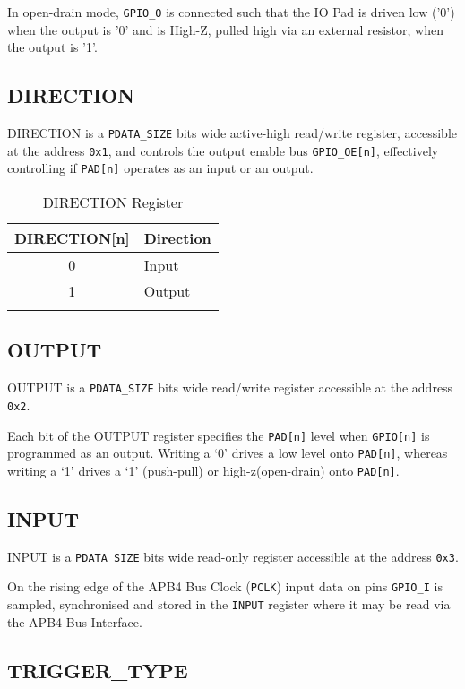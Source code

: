 In open-drain mode, \texttt{GPIO\_O} is connected such that the IO Pad is driven low ('0') when the output is '0' and is High-Z, pulled high via an external resistor, when the output is '1'.

\subsection{DIRECTION}\label{direction}

DIRECTION is a \texttt{PDATA\_SIZE} bits wide active-high read/write register, accessible at the address \texttt{0x1}, and controls the output enable bus \texttt{GPIO\_OE[n]}, effectively controlling if \texttt{PAD[n]} operates as an input or an output.

\begin{longtable}[]{@{}cl@{}}
\toprule
\textbf{DIRECTION[n]} & \textbf{Direction}\tabularnewline
\midrule
\endhead
0 & Input\tabularnewline
1 & Output\tabularnewline
\bottomrule
\caption{DIRECTION Register}
\end{longtable}

\subsection{OUTPUT}\label{output}

OUTPUT is a \texttt{PDATA\_SIZE} bits wide read/write register accessible at the address \texttt{0x2}.

Each bit of the OUTPUT register specifies the \texttt{PAD[n]} level when \texttt{GPIO[n]} is programmed as an output. Writing a ‘0’ drives a low level onto \texttt{PAD[n]}, whereas writing a ‘1’ drives a ‘1’ (push-pull) or high-z(open-drain) onto \texttt{PAD[n]}.

\subsection{INPUT}\label{input}

INPUT is a \texttt{PDATA\_SIZE} bits wide read-only register accessible at the address \texttt{0x3}.

On the rising edge of the APB4 Bus Clock (\texttt{PCLK}) input data on pins
\texttt{GPIO\_I} is sampled, synchronised and stored in the \texttt{INPUT} register where it may be read via the APB4 Bus Interface.

\subsection{TRIGGER\_TYPE}\label{triggertype}

